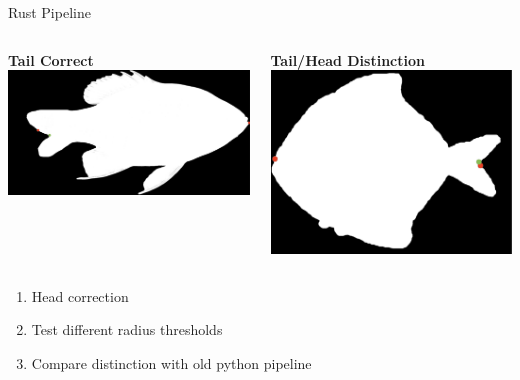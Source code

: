\begin{frame}{Rust Pipeline}
  \begin{columns}[c]
        \centering
        \textbf{Tail Correct}\\[1ex]
        \includegraphics[height=0.48\textheight,keepaspectratio]{./images/fish2_out.png}
  
        \centering
        \textbf{Tail/Head Distinction}\\[1ex]
        \includegraphics[height=0.48\textheight,keepaspectratio]{./images/fish6_out.png}
  \end{columns}
      \begin{enumerate}
        \item Head correction
        \item Test different radius thresholds
        \item Compare distinction with old python pipeline
    \end{enumerate}
\end{frame}
